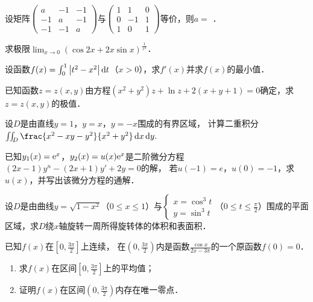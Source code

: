 \documentclass[plain,noanswer,medmath]{../../template/jnuexam}
\begin{document}
\begin{problem}
设矩阵$\begin{pmatrix}
   a & -1 & -1 \\
  -1 &  a & -1 \\
  -1 & -1 & a
\end{pmatrix}$与$\begin{pmatrix}
  1 &  1 & 0 \\
  0 & -1 & 1 \\
  1 &  0 & 1
\end{pmatrix}$等价，则$a =$ \fillin{}．
\end{problem}




\begin{problem}[points=10]
求极限$\lim_{x \to 0} (\cos 2x + 2x\sin x)^{\frac{1}{x^4}}$．
\end{problem}


\begin{problem}[points=10]
设函数$f(x) = \int_0^1 \left| t^2 - x^2 \right|\mathop{}\!\mathrm{d} t$（$x > 0$），求$f'(x)$并求$f(x)$的最小值．
\end{problem}


\begin{problem}[points=10]
已知函数$z = z(x,y)$由方程$(x^2 + y^2)z + \ln z + 2(x + y + 1) = 0$确定，求$z = z(x,y)$的极值．
\end{problem}


\begin{problem}[points=10]
设$D$是由直线$y = 1$，$y = x$，$y = - x$围成的有界区域，\goodbreak
计算二重积分$\iint_D \frac{x^2 - xy - y^2}{x^2 + y^2}\dx\dy.$
\end{problem}


\begin{problem}[points=10]
已知$y_1(x) = \mathrm{e}^x$，$y_2(x) = u(x) \mathrm{e}^x$是二阶微分方程$(2x - 1)y^n - (2x + 1)y' + 2y = 0$的解，
若$u(- 1) = e$，$u(0) = - 1$，求$u(x)$，并写出该微分方程的通解．
\end{problem}


\begin{problem}[points=11]
设$D$是由曲线$y = \sqrt{1 - x^2}$（$0 \le x \le 1$）与$\begin{cases}
  x = \cos^3 t \\
  y = \sin^3 t
\end{cases}$（$0 \le t \le \frac{\pi}{2}$）围成的平面区域，求$D$绕$x$轴旋转一周所得旋转体的体积和表面积．
\end{problem}


\begin{problem}[points=11]
已知$f(x)$在$\left[0,\frac{3\pi}{2} \right]$上连续，
在$\left(0,\frac{3\pi}{2} \right)$内是函数$\frac{\cos x}{2x - 3\pi}$的一个原函数$f(0) = 0$．
\begin{enumerate}
\item 求$f(x)$在区间$\left[0,\frac{3\pi}{2} \right]$上的平均值；
\item 证明$f(x)$在区间$\left(0,\frac{3\pi}{2} \right)$内存在唯一零点．
\end{enumerate}
\end{problem}
\end{document}
